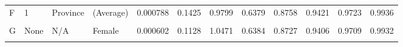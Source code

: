 \documentclass[
]{report}
\begin{document}
\begin{table}[!h]
\begin{tabular}[t]{llllrrrrrrrr}
F & 1 & Province & (Average) & 0.000788 & 0.1425 & 0.9799 & 0.6379 & 0.8758 & 0.9421 & 0.9723 & 0.9936\\
\cellcolor{gray!6}{G} & \cellcolor{gray!6}{None} & \cellcolor{gray!6}{N/A} & \cellcolor{gray!6}{Male} & \cellcolor{gray!6}{0.000991} & \cellcolor{gray!6}{0.1780} & \cellcolor{gray!6}{0.9437} & \cellcolor{gray!6}{0.6189} & \cellcolor{gray!6}{0.8652} & \cellcolor{gray!6}{0.9362} & \cellcolor{gray!6}{0.9686} & \cellcolor{gray!6}{0.9930}\\
G & None & N/A & Female & 0.000602 & 0.1128 & 1.0471 & 0.6384 & 0.8727 & 0.9406 & 0.9709 & 0.9932\\
\addlinespace
\cellcolor{gray!6}{G} & \cellcolor{gray!6}{None} & \cellcolor{gray!6}{N/A} & \cellcolor{gray!6}{(Average)} & \cellcolor{gray!6}{0.000797} & \cellcolor{gray!6}{0.1454} & \cellcolor{gray!6}{0.9954} & \cellcolor{gray!6}{0.6286} & \cellcolor{gray!6}{0.8689} & \cellcolor{gray!6}{0.9384} & \cellcolor{gray!6}{0.9697} & \cellcolor{gray!6}{0.9931}\\
\bottomrule
\end{tabular}
\end{table}
\end{document}
